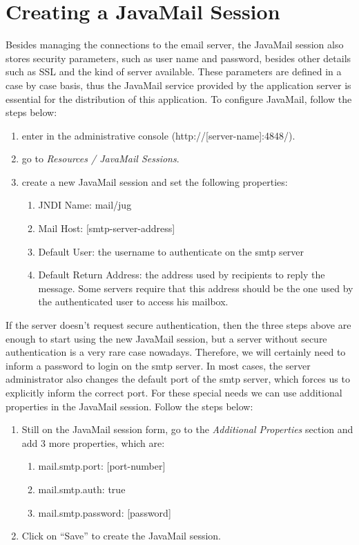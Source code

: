 \documentclass[envcountsame,envcountchap]{svmono}
\begin{document}
\section{Creating a JavaMail Session}

Besides managing the connections to the email server, the JavaMail session also stores security parameters, such as user name and password, besides other details such as SSL and the kind of server available. These parameters are defined in a case by case basis, thus the JavaMail service provided by the application server is essential for the distribution of this application. To configure JavaMail, follow the steps below:

\begin{enumerate}
\item enter in the administrative console (http://[server-name]:4848/).
\item go to \textit{Resources / JavaMail Sessions}.
\item create a new JavaMail session and set the following properties:
   \begin{enumerate}
   \item JNDI Name: mail/jug
   \item Mail Host: [smtp-server-address]
   \item Default User: the username to authenticate on the smtp
    server
   \item Default Return Address: the address used by recipients to
    reply the message. Some servers require that this address
    should be the one used by the authenticated user to access his
    mailbox.
   \end{enumerate}
\end{enumerate}
 
If the server doesn't request secure authentication, then the three steps above are enough to start using the new JavaMail session, but a server without secure authentication is a very rare case nowadays. Therefore, we will certainly need to inform a password to login on the smtp server. In most cases, the server administrator also changes the default port of the smtp server, which forces us to explicitly inform the correct port. For these special needs we can use additional properties in the JavaMail session. Follow the steps below:

\begin{enumerate}
\item Still on the JavaMail session form, go to the \textit{Additional Properties} section and add 3 more properties, which are:
   \begin{enumerate}
   \item mail.smtp.port: [port-number]
   \item mail.smtp.auth: true
   \item mail.smtp.password: [password]
   \end{enumerate}
\item Click on “Save” to create the JavaMail session.
\end{enumerate}
\end{document}
